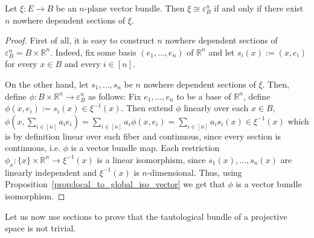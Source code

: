 \begin{lemma}\label{lem:n_sections_makes_trivial} Let $\xi:E\to B$ be an $n$-plane vector bundle. Then $\xi\cong\varepsilon_B^n$ if and only if there exist $n$ nowhere dependent sections of $\xi$.
\end{lemma}
\begin{proof} First of all, it is easy to construct $n$ nowhere dependent sections of $\varepsilon_B^n=B\times\mathbb{R}^n$. Indeed, fix some basis $(e_1,\ldots,e_n)$ of $\mathbb{R}^n$ and let $s_i(x):=(x,e_i)$ for every $x\in B$ and every $i\in[n]$.

On the other hand, let $s_1,\ldots,s_n$ be $n$ nowhere dependent sections of $\xi$. Then, define $\phi:B\times\mathbb{R}^n\to\varepsilon_B^n$ as follows: Fix $e_1,\ldots,e_n$ to be a base of $\mathbb{R}^n$, define $\phi(x,e_i):=s_i(x)\in\xi^{-1}(x)$. Then extend $\phi$ linearly over each $x\in B$,
$\phi\left(x,\sum_{i\in[n]}a_ie_i\right)=\sum_{i\in[n]}a_i\phi(x,e_i)=\sum_{i\in[n]}a_is_i(x)\in\xi^{-1}(x)$
which is by definition linear over each fiber and continuous, since every section is continuous, i.e. $\phi$ is a vector bundle map. Each restriction $\phi_x:\{x\}\times\mathbb{R}^n\to\xi^{-1}(x)$ is a linear isomorphism, since $s_1(x),\ldots,s_n(x)$ are linearly independent and $\xi^{-1}(x)$ is $n$-dimensional. Thus, using Proposition~\ref{prop:local_to_global_iso_vector} we get that $\phi$ is a vector bundle isomorphism.
\end{proof}

Let us now use sections to prove that the tautological bundle of a projective space is not trivial.

